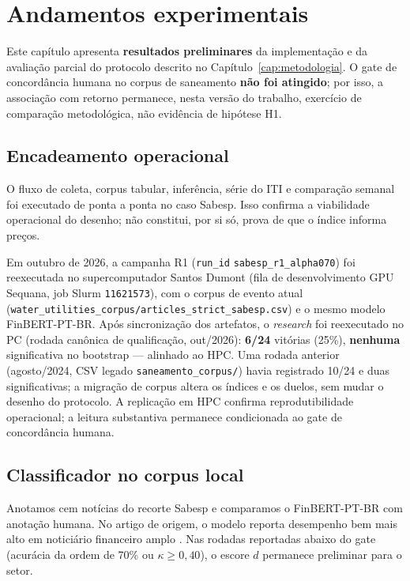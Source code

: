 \chapter{Andamentos experimentais}
\label{cap:andamentos}

Este capítulo apresenta \textbf{resultados preliminares} da implementação e da avaliação parcial do protocolo descrito no Capítulo~\ref{cap:metodologia}. O gate de concordância humana no corpus de saneamento \textbf{não foi atingido}; por isso, a associação com retorno permanece, nesta versão do trabalho, exercício de comparação metodológica, não evidência de hipótese H1.

\section{Encadeamento operacional}

O fluxo de coleta, corpus tabular, inferência, série do ITI e comparação semanal foi executado de ponta a ponta no caso Sabesp. Isso confirma a viabilidade operacional do desenho; não constitui, por si só, prova de que o índice informa preços.

Em outubro de 2026, a campanha R1 (\texttt{run\_id} \texttt{sabesp\_r1\_alpha070}) foi reexecutada no supercomputador Santos Dumont (fila de desenvolvimento GPU Sequana, job Slurm \texttt{11621573}), com o corpus de evento atual (\texttt{water\_utilities\_corpus/articles\_strict\_sabesp.csv}) e o mesmo modelo FinBERT-PT-BR. Após sincronização dos artefatos, o \emph{research} foi reexecutado no PC (rodada canônica de qualificação, out/2026): \textbf{6/24} vitórias (25\%), \textbf{nenhuma} significativa no bootstrap --- alinhado ao HPC. Uma rodada anterior (agosto/2024, CSV legado \texttt{saneamento\_corpus/}) havia registrado 10/24 e duas significativas; a migração de corpus altera os índices e os duelos, sem mudar o desenho do protocolo. A replicação em HPC confirma reprodutibilidade operacional; a leitura substantiva permanece condicionada ao gate de concordância humana.

\section{Classificador no corpus local}
\label{sec:classificador_local}

Anotamos cem notícias do recorte Sabesp e comparamos o FinBERT-PT-BR com anotação humana. No artigo de origem, o modelo reporta desempenho bem mais alto em noticiário financeiro amplo \cite{santos2023finbert}. Nas rodadas reportadas abaixo do gate (acurácia da ordem de 70\% ou $\kappa \geq 0{,}40$), o escore $d$ permanece preliminar para o setor.

